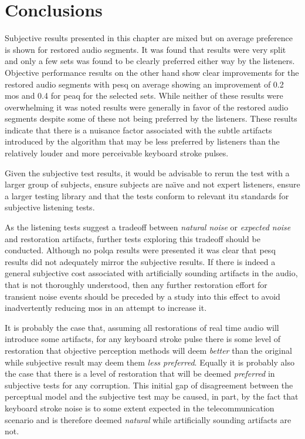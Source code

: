 \section{Conclusions}\label{sec:RestorationResults}
Subjective results presented in this chapter are mixed but on average preference is shown for restored audio segments. It was found that results were very split and only a few sets was found to be clearly preferred either way by the listeners. Objective performance results on the other hand show clear improvements for the restored audio segments with \gls{pesq} on average showing an improvement of 0.2 \gls{mos} and 0.4 for \gls{peaq} for the selected sets. While neither of these results were overwhelming it was noted results were generally in favor of the restored audio segments despite some of these not being preferred by the listeners. These results indicate that there is a nuisance factor associated with the subtle artifacts introduced by the algorithm that may be less preferred by listeners than the relatively louder and more perceivable keyboard stroke pulses. 

\label{corrections:conclusionSubjective}Given the subjective test results, it would be advisable to rerun the test with a larger group of subjects, ensure subjects are na\"{\i}ve and not expert listeners, ensure a larger testing library and that the tests conform to relevant \gls{itu} standards for subjective listening tests.

As the listening tests suggest a tradeoff between \emph{natural noise} or \emph{expected noise} and restoration artifacts, further tests exploring this tradeoff should be conducted. Although no \gls{polqa} results were presented it was clear that \gls{pesq} results did not adequately mirror the subjective results. If there is indeed a general subjective cost associated with artificially sounding artifacts in the audio, that is not thoroughly understood, then any further restoration effort for transient noise events should be preceded by a study into this effect to avoid inadvertently reducing \gls{mos} in an attempt to increase it.

It is probably the case that, assuming all restorations of real time audio will introduce some artifacts, for any keyboard stroke pulse there is some level of restoration that objective perception methods will deem \emph{better} than the original while subjective result may deem them \emph{less preferred}. Equally it is probably also the case that there is a level of restoration that will be deemed \emph{preferred} in subjective tests for any corruption. This initial gap of disagreement between the perceptual model and the subjective test may be caused, in part, by the fact that keyboard stroke noise is to some extent expected in the telecommunication scenario and is therefore deemed \emph{natural} while artificially sounding artifacts are not.

